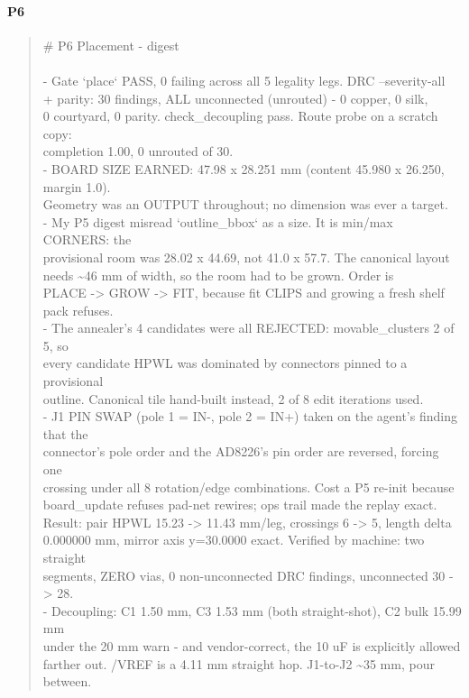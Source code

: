 \documentclass[11pt,a4paper]{article}
\begin{document}
\paragraph*{P6}
\begin{quote}\small\ttfamily\raggedright
\# P6 Placement - digest\\
~\\
- Gate `place` PASS, 0 failing across all 5 legality legs. DRC --severity-all\\
  + parity: 30 findings, ALL unconnected (unrouted) - 0 copper, 0 silk,\\
  0 courtyard, 0 parity. check\_decoupling pass. Route probe on a scratch copy:\\
  completion 1.00, 0 unrouted of 30.\\
- BOARD SIZE EARNED: 47.98 x 28.251 mm (content 45.980 x 26.250, margin 1.0).\\
  Geometry was an OUTPUT throughout; no dimension was ever a target.\\
- My P5 digest misread `outline\_bbox` as a size. It is min/max CORNERS: the\\
  provisional room was 28.02 x 44.69, not 41.0 x 57.7. The canonical layout\\
  needs \textasciitilde{}46 mm of width, so the room had to be grown. Order is\\
  PLACE -\textgreater{} GROW -\textgreater{} FIT, because fit CLIPS and growing a fresh shelf pack refuses.\\
- The annealer's 4 candidates were all REJECTED: movable\_clusters 2 of 5, so\\
  every candidate HPWL was dominated by connectors pinned to a provisional\\
  outline. Canonical tile hand-built instead, 2 of 8 edit iterations used.\\
- J1 PIN SWAP (pole 1 = IN-, pole 2 = IN+) taken on the agent's finding that the\\
  connector's pole order and the AD8226's pin order are reversed, forcing one\\
  crossing under all 8 rotation/edge combinations. Cost a P5 re-init because\\
  board\_update refuses pad-net rewires; ops trail made the replay exact.\\
  Result: pair HPWL 15.23 -\textgreater{} 11.43 mm/leg, crossings 6 -\textgreater{} 5, length delta\\
  0.000000 mm, mirror axis y=30.0000 exact. Verified by machine: two straight\\
  segments, ZERO vias, 0 non-unconnected DRC findings, unconnected 30 -\textgreater{} 28.\\
- Decoupling: C1 1.50 mm, C3 1.53 mm (both straight-shot), C2 bulk 15.99 mm\\
  under the 20 mm warn - and vendor-correct, the 10 uF is explicitly allowed\\
  farther out. /VREF is a 4.11 mm straight hop. J1-to-J2 \textasciitilde{}35 mm, pour between.
\end{quote}
\end{document}
